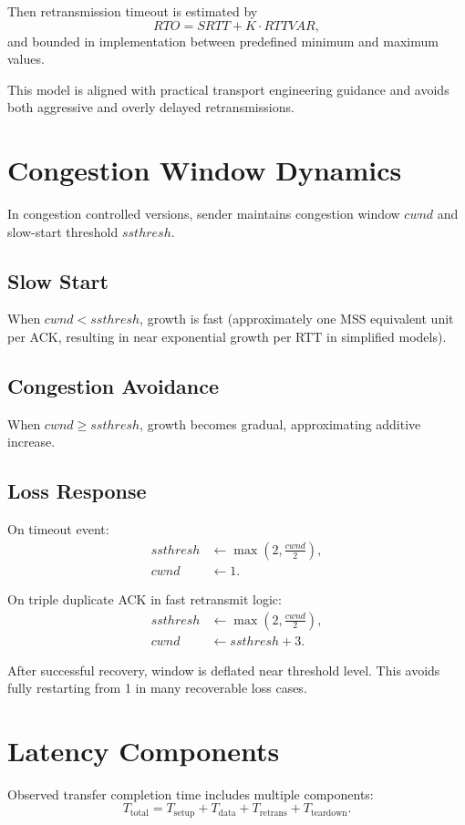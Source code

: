 Then retransmission timeout is estimated by
\begin{equation}
RTO = SRTT + K \cdot RTTVAR,
\end{equation}
and bounded in implementation between predefined minimum and maximum values.

This model is aligned with practical transport engineering guidance and avoids
both aggressive and overly delayed retransmissions.

\section{Congestion Window Dynamics}
In congestion controlled versions, sender maintains congestion window $cwnd$ and
slow-start threshold $ssthresh$.

\subsection{Slow Start}
When $cwnd < ssthresh$, growth is fast (approximately one MSS equivalent unit
per ACK, resulting in near exponential growth per RTT in simplified models).

\subsection{Congestion Avoidance}
When $cwnd \ge ssthresh$, growth becomes gradual, approximating additive
increase.

\subsection{Loss Response}
On timeout event:
\begin{align}
ssthresh &\leftarrow \max\left(2, \frac{cwnd}{2}\right), \\
cwnd &\leftarrow 1.
\end{align}

On triple duplicate ACK in fast retransmit logic:
\begin{align}
ssthresh &\leftarrow \max\left(2, \frac{cwnd}{2}\right), \\
cwnd &\leftarrow ssthresh + 3.
\end{align}

After successful recovery, window is deflated near threshold level. This avoids
fully restarting from 1 in many recoverable loss cases.

\section{Latency Components}
Observed transfer completion time includes multiple components:
\begin{equation}
T_{\text{total}} = T_{\text{setup}} + T_{\text{data}} + T_{\text{retrans}} + T_{\text{teardown}}.
\end{equation}

